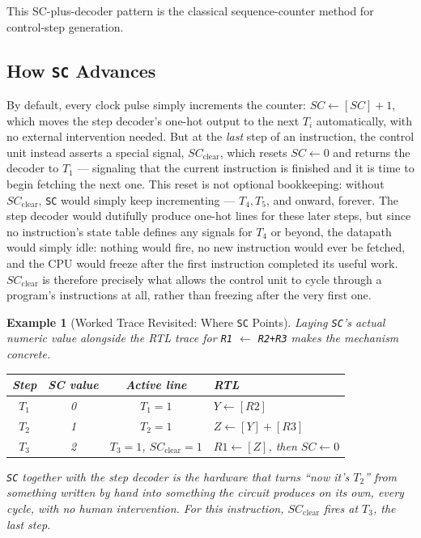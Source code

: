 \documentclass[11pt]{article}
\newtheorem{example}{Example}[section]
\begin{document}
This SC-plus-decoder pattern is the classical sequence-counter method for control-step generation.

\subsection{How \texttt{SC} Advances}

By default, every clock pulse simply increments the counter: $SC \gets [SC] + 1$, which moves the step decoder's one-hot output to the next $T_i$ automatically, with no external intervention needed. But at the \emph{last} step of an instruction, the control unit instead asserts a special signal, $SC_{\text{clear}}$, which resets $SC \gets 0$ and returns the decoder to $T_1$ --- signaling that the current instruction is finished and it is time to begin fetching the next one. This reset is not optional bookkeeping: without $SC_{\text{clear}}$, \texttt{SC} would simply keep incrementing --- $T_4, T_5$, and onward, forever. The step decoder would dutifully produce one-hot lines for these later steps, but since no instruction's state table defines any signals for $T_4$ or beyond, the datapath would simply idle: nothing would fire, no new instruction would ever be fetched, and the CPU would freeze after the first instruction completed its useful work. $SC_{\text{clear}}$ is therefore precisely what allows the control unit to cycle through a program's instructions at all, rather than freezing after the very first one.

\begin{example}[Worked Trace Revisited: Where \texttt{SC} Points]
Laying \texttt{SC}'s actual numeric value alongside the RTL trace for \texttt{R1} $\gets$ \texttt{R2+R3} makes the mechanism concrete.
\begin{center}
\footnotesize
\begin{tabular}{@{}cccl@{}}
\toprule
\textbf{Step} & \textbf{SC value} & \textbf{Active line} & \textbf{RTL} \\
\midrule
$T_1$ & 0 & $T_1=1$ & $Y \gets [R2]$ \\
$T_2$ & 1 & $T_2=1$ & $Z \gets [Y] + [R3]$ \\
$T_3$ & 2 & $T_3=1$, $SC_{\text{clear}}=1$ & $R1 \gets [Z]$, then $SC \gets 0$ \\
\bottomrule
\end{tabular}
\end{center}
\texttt{SC} together with the step decoder \emph{is} the hardware that turns ``now it's $T_2$'' from something written by hand into something the circuit produces on its own, every cycle, with no human intervention. For this instruction, $SC_{\text{clear}}$ fires at $T_3$, the last step.
\end{example}
\end{document}
